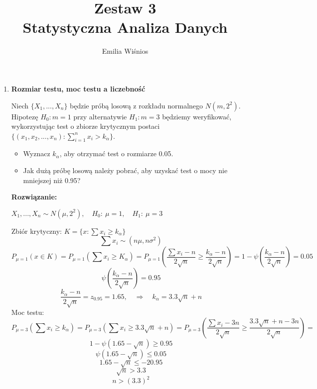 \documentclass[11pt]{article}
\title{Zestaw 3 \\[0.2em]\smaller{} Statystyczna Analiza Danych}
\author{Emilia Wiśnios}
\begin{document}
\maketitle
\medskip
\begin{enumerate}
    \item \textbf{Rozmiar testu, moc testu a liczebność}
    \par Niech \(\{X_1, . . . , X_n\}\) będzie próbą losową z rozkładu normalnego \(N(m, 2^2)\). Hipotezę \(H_0 : m = 1\) przy alternatywie \(H_1 : m = 3\) będziemy weryfikować, wykorzystując test o zbiorze krytycznym postaci \(\{(x_1, x_2, . . . , x_n) : \sum_{i=1}^{n} x_i > k_\alpha\}\).
    \begin{itemize}
        \item Wyznacz \(k_\alpha\), aby otrzymać test o rozmiarze 0.05.
        \item Jak dużą próbę losową należy pobrać, aby uzyskać test o mocy nie mniejszej niż 0.95?
    \end{itemize}
    \textbf{Rozwiązanie: }
    \par 
    \(X_1, ..., X_n \sim N(\mu, 2^2), \quad H_0: \: \mu=1, \quad H_1: \: \mu=3 \)
    \par 
    Zbiór krytyczny: \(K = \{x: \sum x_i \geq k_\alpha \}\)
    \[\sum x_i \sim (n \mu, n \sigma^2)\]
    \[P_{\mu = 1}(x \in K) = P_{\mu =1} (\sum x_i \geq K_\alpha) = P_{\mu=1} \left(\frac{\sum x_i -n }{2 \sqrt{n}} \geq \frac{k_\alpha - n}{2 \sqrt{n}} \right)= 1 - \psi \left(\frac{k_\alpha - n}{2 \sqrt{n}} \right) = 0.05\]
    \[\psi \left(\frac{k_\alpha - n}{2 \sqrt{n}} \right) = 0.95\]
    \[\frac{k_\alpha - n}{2 \sqrt{n}} = z_{0.95} = 1.65, \quad \Rightarrow \quad k_\alpha = 3.3 \sqrt{n} +n \]
    Moc testu: 
    \[P_{\mu =3}(\sum x_i \geq k_\alpha) = P_{\mu =3}(\sum x_i \geq 3.3 \sqrt{n} + n) = P_{\mu =3}\left(\frac{\sum x_i -3n}{2 \sqrt{n}} \geq \frac{3.3 \sqrt{n} + n - 3n}{2 \sqrt{n}} \right) = \]
    \[1 - \psi(1.65 - \sqrt{n}) \geq 0.95\]
    \[\psi(1.65 - \sqrt{n}) \leq 0.05\]
    \[1.65 - \sqrt{n} \leq - 20.95\]
    \[\sqrt{n} > 3.3\]
    \[n > (3.3)^2\]


\end{enumerate}
\end{document}
